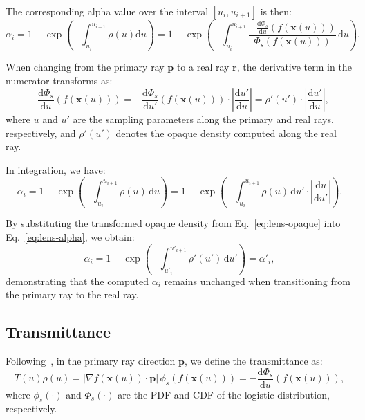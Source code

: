 The corresponding alpha value over the interval \([u_i, u_{i+1}]\) is then:
\begin{equation}
    \alpha_i = 1 - \exp\left(
    -\int_{u_i}^{u_{i+1}} \rho(u)\mathrm{d}u
    \right) = 1 - \exp\left(
    -\int_{u_i}^{u_{i+1}} \frac{-\frac{\mathrm{d}\Phi_s}{\mathrm{d}u}(f(\mathbf{x}(u)))}{\Phi_s(f(\mathbf{x}(u)))} \, \mathrm{d}u
    \right).
\end{equation}

When changing from the primary ray \( \mathbf{p} \) to a real ray \( \mathbf{r} \), the derivative term in the numerator transforms as:
\begin{equation}
\label{eq:lens-opaque}
    -\frac{\mathrm{d}\Phi_s}{\mathrm{d}u}(f(\mathbf{x}(u))) = -\frac{\mathrm{d}\Phi_s}{\mathrm{d}u'}(f(\mathbf{x}(u))) \cdot \left|\frac{\mathrm{d}u'}{\mathrm{d}u}\right| = \rho'(u') \cdot \left|\frac{\mathrm{d}u'}{\mathrm{d}u}\right|,
\end{equation}
where \( u \) and \( u' \) are the sampling parameters along the primary and real rays, respectively, and \( \rho'(u') \) denotes the opaque density computed along the real ray.

In integration, we have:
\begin{equation}
\label{eq:lens-alpha}
    \alpha_i = 1 - \exp\left(
    -\int_{u_i}^{u_{i+1}} \rho(u) \, \mathrm{d}u
    \right) 
    = 1 - \exp\left(
    -\int_{u_i}^{u_{i+1}} \rho(u) \, \mathrm{d}u' \cdot \left| \frac{\mathrm{d}u}{\mathrm{d}u'} \right|
    \right).
\end{equation}

By substituting the transformed opaque density from Eq.~\ref{eq:lens-opaque} into Eq.~\ref{eq:lens-alpha}, we obtain:
\begin{equation}
    \alpha_i = 1 - \exp\left(
    -\int_{u'_i}^{u'_{i+1}} \rho'(u') \, \mathrm{d}u'
    \right) = \alpha'_i,
\end{equation}
demonstrating that the computed \( \alpha_i \) remains unchanged when transitioning from the primary ray to the real ray.

\subsection{Transmittance}
\label{sec:app-alpha-blending-trans}
Following~\cite{wang2021neus}, 
in the primary ray direction \( \mathbf{p} \), we define the transmittance as:
\begin{equation}
\label{eq:tpho_1}
    T(u)\rho(u) = \left| \nabla f(\mathbf{x}(u)) \cdot \mathbf{p} \right|\, \phi_s(f(\mathbf{x}(u))) = -\frac{\mathrm{d}\Phi_s}{\mathrm{d}u}(f(\mathbf{x}(u))),
\end{equation}
where \( \phi_s(\cdot) \) and \( \Phi_s(\cdot) \) are the PDF and CDF of the logistic distribution, respectively.


